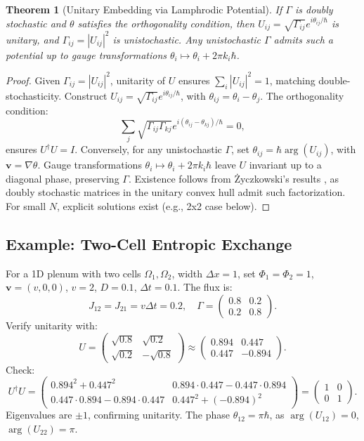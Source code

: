 \documentclass[12pt]{article}
\newtheorem{theorem}{Theorem}
\begin{document}
\begin{theorem}[Unitary Embedding via Lamphrodic Potential]
\label{thm:unitaryembedding}
If \(\Gamma\) is doubly stochastic and \(\theta\) satisfies the orthogonality condition, then \(U_{ij} = \sqrt{\Gamma_{ij}} e^{i \theta_{ij} / \hbar}\) is unitary, and \(\Gamma_{ij} = |U_{ij}|^2\) is unistochastic. Any unistochastic \(\Gamma\) admits such a potential up to gauge transformations \(\theta_i \mapsto \theta_i + 2\pi k_i \hbar\).
\end{theorem}

\begin{proof}
Given \(\Gamma_{ij} = |U_{ij}|^2\), unitarity of \(U\) ensures \(\sum_i |U_{ij}|^2 = 1\), matching double-stochasticity. Construct \(U_{ij} = \sqrt{\Gamma_{ij}} e^{i \theta_{ij} / \hbar}\), with \(\theta_{ij} = \theta_i - \theta_j\). The orthogonality condition:
\[
\sum_j \sqrt{\Gamma_{ij} \Gamma_{kj}} e^{i (\theta_{ij} - \theta_{kj}) / \hbar} = 0,
\]
ensures \(U^\dagger U = I\). Conversely, for any unistochastic \(\Gamma\), set \(\theta_{ij} = \hbar \arg(U_{ij})\), with \(\mathbf{v} = \nabla \theta\). Gauge transformations \(\theta_i \mapsto \theta_i + 2\pi k_i \hbar\) leave \(U\) invariant up to a diagonal phase, preserving \(\Gamma\). Existence follows from Życzkowski’s results \citep{Zyczkowski1994}, as doubly stochastic matrices in the unitary convex hull admit such factorization. For small \(N\), explicit solutions exist (e.g., 2x2 case below).
\end{proof}

\subsection{Example: Two-Cell Entropic Exchange}

For a 1D plenum with two cells \(\Omega_1, \Omega_2\), width \(\Delta x = 1\), set \(\Phi_1 = \Phi_2 = 1\), \(\mathbf{v} = (v, 0, 0)\), \(v = 2\), \(D = 0.1\), \(\Delta t = 0.1\). The flux is:
\[
J_{12} = J_{21} = v \Delta t = 0.2, \quad \Gamma = \begin{pmatrix} 0.8 & 0.2 \\ 0.2 & 0.8 \end{pmatrix}.
\]
Verify unitarity with:
\[
U = \begin{pmatrix} \sqrt{0.8} & \sqrt{0.2} \\ \sqrt{0.2} & -\sqrt{0.8} \end{pmatrix} \approx \begin{pmatrix} 0.894 & 0.447 \\ 0.447 & -0.894 \end{pmatrix}.
\]
Check:
\[
U^\dagger U = \begin{pmatrix} 0.894^2 + 0.447^2 & 0.894 \cdot 0.447 - 0.447 \cdot 0.894 \\ 0.447 \cdot 0.894 - 0.894 \cdot 0.447 & 0.447^2 + (-0.894)^2 \end{pmatrix} = \begin{pmatrix} 1 & 0 \\ 0 & 1 \end{pmatrix}.
\]
Eigenvalues are \(\pm 1\), confirming unitarity. The phase \(\theta_{12} = \pi \hbar\), as \(\arg(U_{12}) = 0\), \(\arg(U_{22}) = \pi\).
\end{document}
